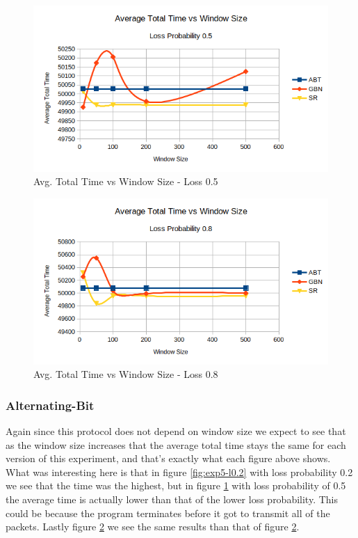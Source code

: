 \documentclass[10pt, a4paper]{article}
\begin{document}
    \begin{figure}[H]
        \includegraphics[width=\textwidth]{exp5-l05.png}
        \centering
        \caption{Avg. Total Time vs Window Size - Loss 0.5  }
        \label{fig:exp5-l0.5}
    \end{figure}
        
    \begin{figure}[H]
        \includegraphics[width=\textwidth]{exp5-l08.png}
        \centering
        \caption{Avg. Total Time vs Window Size - Loss 0.8 }
        \label{fig:exp5-l0.8}
    \end{figure}
    
    \subsubsection{Alternating-Bit}
        
        Again since this protocol does not depend on window size we expect to see that as the window size increases that the average total time stays the same for each version of this experiment, and that's exactly what each figure above shows. What was interesting here is that in figure \ref{fig:exp5-l0.2} with loss probability 0.2 we see that the time was the highest, but in figure \ref{fig:exp5-l0.5} with loss probability of 0.5 the average time is actually lower than that of the lower loss probability. This could be because the program terminates before it got to transmit all of the packets. Lastly figure \ref{fig:exp5-l0.8} we see the same results than that of figure \ref{fig:exp5-l0.8}.
    
\end{document}
